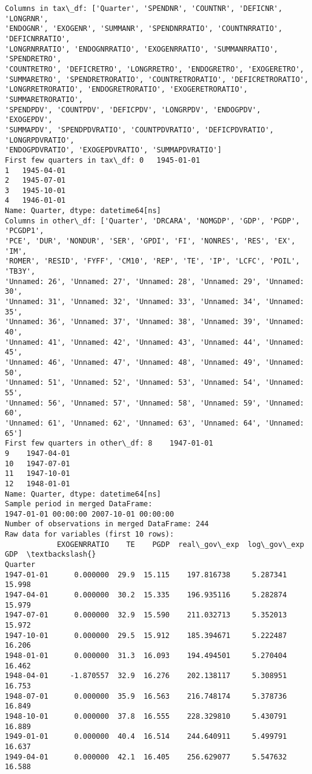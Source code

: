 \documentclass[11pt]{article}
\begin{document}
    \begin{Verbatim}[commandchars=\\\{\}]
Columns in tax\_df: ['Quarter', 'SPENDNR', 'COUNTNR', 'DEFICNR', 'LONGRNR',
'ENDOGNR', 'EXOGENR', 'SUMMANR', 'SPENDNRRATIO', 'COUNTNRRATIO', 'DEFICNRRATIO',
'LONGRNRRATIO', 'ENDOGNRRATIO', 'EXOGENRRATIO', 'SUMMANRRATIO', 'SPENDRETRO',
'COUNTRETRO', 'DEFICRETRO', 'LONGRRETRO', 'ENDOGRETRO', 'EXOGERETRO',
'SUMMARETRO', 'SPENDRETRORATIO', 'COUNTRETRORATIO', 'DEFICRETRORATIO',
'LONGRRETRORATIO', 'ENDOGRETRORATIO', 'EXOGERETRORATIO', 'SUMMARETRORATIO',
'SPENDPDV', 'COUNTPDV', 'DEFICPDV', 'LONGRPDV', 'ENDOGPDV', 'EXOGEPDV',
'SUMMAPDV', 'SPENDPDVRATIO', 'COUNTPDVRATIO', 'DEFICPDVRATIO', 'LONGRPDVRATIO',
'ENDOGPDVRATIO', 'EXOGEPDVRATIO', 'SUMMAPDVRATIO']
First few quarters in tax\_df: 0   1945-01-01
1   1945-04-01
2   1945-07-01
3   1945-10-01
4   1946-01-01
Name: Quarter, dtype: datetime64[ns]
Columns in other\_df: ['Quarter', 'DRCARA', 'NOMGDP', 'GDP', 'PGDP', 'PCGDP1',
'PCE', 'DUR', 'NONDUR', 'SER', 'GPDI', 'FI', 'NONRES', 'RES', 'EX', 'IM',
'ROMER', 'RESID', 'FYFF', 'CM10', 'REP', 'TE', 'IP', 'LCFC', 'POIL', 'TB3Y',
'Unnamed: 26', 'Unnamed: 27', 'Unnamed: 28', 'Unnamed: 29', 'Unnamed: 30',
'Unnamed: 31', 'Unnamed: 32', 'Unnamed: 33', 'Unnamed: 34', 'Unnamed: 35',
'Unnamed: 36', 'Unnamed: 37', 'Unnamed: 38', 'Unnamed: 39', 'Unnamed: 40',
'Unnamed: 41', 'Unnamed: 42', 'Unnamed: 43', 'Unnamed: 44', 'Unnamed: 45',
'Unnamed: 46', 'Unnamed: 47', 'Unnamed: 48', 'Unnamed: 49', 'Unnamed: 50',
'Unnamed: 51', 'Unnamed: 52', 'Unnamed: 53', 'Unnamed: 54', 'Unnamed: 55',
'Unnamed: 56', 'Unnamed: 57', 'Unnamed: 58', 'Unnamed: 59', 'Unnamed: 60',
'Unnamed: 61', 'Unnamed: 62', 'Unnamed: 63', 'Unnamed: 64', 'Unnamed: 65']
First few quarters in other\_df: 8    1947-01-01
9    1947-04-01
10   1947-07-01
11   1947-10-01
12   1948-01-01
Name: Quarter, dtype: datetime64[ns]
Sample period in merged DataFrame:
1947-01-01 00:00:00 2007-10-01 00:00:00
Number of observations in merged DataFrame: 244
Raw data for variables (first 10 rows):
            EXOGENRRATIO    TE    PGDP  real\_gov\_exp  log\_gov\_exp     GDP  \textbackslash{}
Quarter
1947-01-01      0.000000  29.9  15.115    197.816738     5.287341  15.998
1947-04-01      0.000000  30.2  15.335    196.935116     5.282874  15.979
1947-07-01      0.000000  32.9  15.590    211.032713     5.352013  15.972
1947-10-01      0.000000  29.5  15.912    185.394671     5.222487  16.206
1948-01-01      0.000000  31.3  16.093    194.494501     5.270404  16.462
1948-04-01     -1.870557  32.9  16.276    202.138117     5.308951  16.753
1948-07-01      0.000000  35.9  16.563    216.748174     5.378736  16.849
1948-10-01      0.000000  37.8  16.555    228.329810     5.430791  16.889
1949-01-01      0.000000  40.4  16.514    244.640911     5.499791  16.637
1949-04-01      0.000000  42.1  16.405    256.629077     5.547632  16.588


\end{Verbatim}
\end{document}
